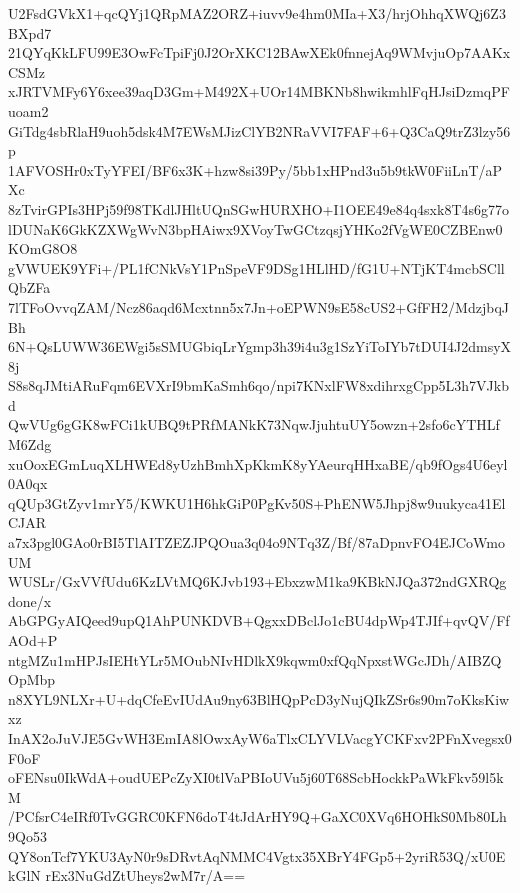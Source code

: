 U2FsdGVkX1+qcQYj1QRpMAZ2ORZ+iuvv9e4hm0MIa+X3/hrjOhhqXWQj6Z3BXpd7
21QYqKkLFU99E3OwFcTpiFj0J2OrXKC12BAwXEk0fnnejAq9WMvjuOp7AAKxCSMz
xJRTVMFy6Y6xee39aqD3Gm+M492X+UOr14MBKNb8hwikmhlFqHJsiDzmqPFuoam2
GiTdg4sbRlaH9uoh5dsk4M7EWsMJizClYB2NRaVVI7FAF+6+Q3CaQ9trZ3lzy56p
1AFVOSHr0xTyYFEI/BF6x3K+hzw8si39Py/5bb1xHPnd3u5b9tkW0FiiLnT/aPXc
8zTvirGPIs3HPj59f98TKdlJHltUQnSGwHURXHO+I1OEE49e84q4sxk8T4s6g77o
lDUNaK6GkKZXWgWvN3bpHAiwx9XVoyTwGCtzqsjYHKo2fVgWE0CZBEnw0KOmG8O8
gVWUEK9YFi+/PL1fCNkVsY1PnSpeVF9DSg1HLlHD/fG1U+NTjKT4mcbSCllQbZFa
7lTFoOvvqZAM/Ncz86aqd6Mcxtnn5x7Jn+oEPWN9sE58cUS2+GfFH2/MdzjbqJBh
6N+QsLUWW36EWgi5sSMUGbiqLrYgmp3h39i4u3g1SzYiToIYb7tDUI4J2dmsyX8j
S8s8qJMtiARuFqm6EVXrI9bmKaSmh6qo/npi7KNxlFW8xdihrxgCpp5L3h7VJkbd
QwVUg6gGK8wFCi1kUBQ9tPRfMANkK73NqwJjuhtuUY5owzn+2sfo6cYTHLfM6Zdg
xuOoxEGmLuqXLHWEd8yUzhBmhXpKkmK8yYAeurqHHxaBE/qb9fOgs4U6eyl0A0qx
qQUp3GtZyv1mrY5/KWKU1H6hkGiP0PgKv50S+PhENW5Jhpj8w9uukyca41ElCJAR
a7x3pgl0GAo0rBI5TlAITZEZJPQOua3q04o9NTq3Z/Bf/87aDpnvFO4EJCoWmoUM
WUSLr/GxVVfUdu6KzLVtMQ6KJvb193+EbxzwM1ka9KBkNJQa372ndGXRQgdone/x
AbGPGyAIQeed9upQ1AhPUNKDVB+QgxxDBclJo1cBU4dpWp4TJIf+qvQV/FfAOd+P
ntgMZu1mHPJsIEHtYLr5MOubNIvHDlkX9kqwm0xfQqNpxstWGcJDh/AIBZQOpMbp
n8XYL9NLXr+U+dqCfeEvIUdAu9ny63BlHQpPcD3yNujQIkZSr6s90m7oKksKiwxz
InAX2oJuVJE5GvWH3EmIA8lOwxAyW6aTlxCLYVLVacgYCKFxv2PFnXvegsx0F0oF
oFENsu0IkWdA+oudUEPcZyXI0tlVaPBIoUVu5j60T68ScbHockkPaWkFkv59l5kM
/PCfsrC4eIRf0TvGGRC0KFN6doT4tJdArHY9Q+GaXC0XVq6HOHkS0Mb80Lh9Qo53
QY8onTcf7YKU3AyN0r9sDRvtAqNMMC4Vgtx35XBrY4FGp5+2yriR53Q/xU0EkGlN
rEx3NuGdZtUheys2wM7r/A==
